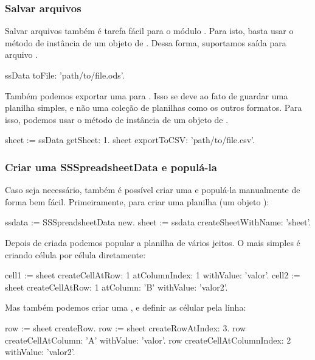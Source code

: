 {\subsubsection{Salvar arquivos}
Salvar arquivos também é tarefa fácil para o módulo \godss. Para isto,
basta usar o método de instância  de um objeto de
. Dessa forma, suportamos saída para arquivo
.

\begin{godSS}[moreemph={toFile:,}]
ssData toFile: 'path/to/file.ods'.
\end{godSS}

Também podemos exportar uma  para . Isso se deve
ao fato de  guardar uma planilha simples, e não uma coleção de
planilhas como os outros formatos. Para isso, podemos usar o método de
instância  de um objeto de .

\begin{godSS}[moreemph={getSheet:,exportToCSV:}]
sheet := ssData getSheet: 1.
sheet exportToCSV: 'path/to/file.csv'.
\end{godSS}

\subsubsection{Criar uma SSSpreadsheetData e populá-la}
Caso seja necessário, também é possível criar uma  
e populá-la manualmente de forma bem fácil. Primeiramente, para criar uma planilha (um objeto ):

\begin{godSS}[moreemph={new,createSheetWithName:,createCellAtRow:,atColumn:,atColumnIndex:,withValue:,createRow}]
ssdata := SSSpreadsheetData new.
sheet := ssdata createSheetWithName: 'sheet'.
\end{godSS}

Depois de criada podemos popular a planilha de vários jeitos. O mais simples é criando célula por célula
diretamente:
\begin{godSS}[moreemph={createCellAtRow:,atColumn:,atColumnIndex:,withValue:}]
cell1 := sheet createCellAtRow: 1 atColumnIndex: 1 withValue: 'valor'.
cell2 := sheet createCellAtRow: 1 atColumn: 'B' withValue: 'valor2'.
\end{godSS}

Mas também podemos criar uma , e definir as célular pela linha:
\begin{godSS}[moreemph={createRow,createRowAtIndex:,createCellAtColumn:,createCellAtColumnIndex:,withValue:}]
row := sheet createRow.
row := sheet createRowAtIndex: 3.
row createCellAtColumn: 'A' withValue: 'valor'.
row createCellAtColumnIndex: 2 withValue: 'valor2'.
\end{godSS}

}
